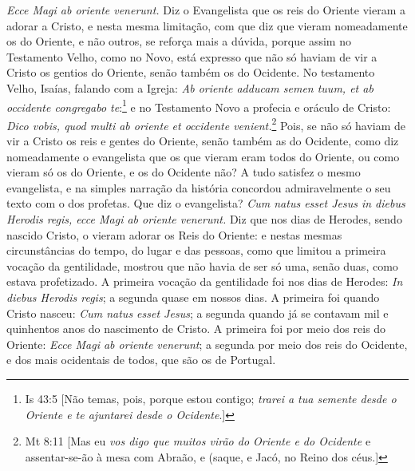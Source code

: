 \emph{Ecce Magi ab oriente venerunt.} Diz o Evangelista que os reis do
Oriente vieram a adorar a Cristo, e nesta mesma limitação, com que diz
que vieram nomeadamente os do Oriente, e não outros, se reforça mais a
dúvida, porque assim no Testamento Velho, como no Novo, está expresso
que não só haviam de vir a Cristo os gentios do Oriente, senão também os
do Ocidente. No testamento Velho, Isaías, falando com a Igreja: \emph{Ab
oriente adducam semen tuum, et ab occidente congregabo te}:\footnote{Is 43:5 [Não temas, pois, porque estou contigo; \emph{trarei a tua semente desde o Oriente e te ajuntarei
desde o Ocidente}.]}
e no Testamento Novo a profecia e oráculo de Cristo:
\emph{Dico vobis, quod multi ab oriente et occidente venient.}\footnote{Mt 8:11 [Mas eu \emph{vos digo que muitos virão do Oriente e do Ocidente} e assentar-se-ão à mesa com
Abraão, e (saque, e Jacó, no Reino dos céus.]} Pois,
se não só haviam de vir a Cristo os reis e gentes do Oriente, senão
também as do Ocidente, como diz nomeadamente o evangelista que os que
vieram eram todos do Oriente, ou como vieram só os do Oriente, e os do
Ocidente não? A tudo satisfez o mesmo evangelista, e na simples narração
da história concordou admiravelmente o seu texto com o dos profetas. Que
diz o evangelista? \emph{Cum natus esset Jesus in diebus Herodis regis,
ecce Magi ab oriente venerunt.} Diz que nos dias de Herodes, sendo
nascido Cristo, o vieram adorar os Reis do Oriente: e nestas mesmas
circunstâncias do tempo, do lugar e das pessoas, como que limitou a
primeira vocação da gentilidade, mostrou que não havia de ser só uma,
senão duas, como estava profetizado. A primeira vocação da gentilidade
foi nos dias de Herodes: \emph{In diebus Herodis regis}; a segunda
quase em nossos dias. A primeira foi quando Cristo nasceu: \emph{Cum
natus esset Jesus}; a segunda quando já se contavam mil e quinhentos
anos do nascimento de Cristo. A primeira foi por meio dos reis do
Oriente: \emph{Ecce Magi ab oriente venerunt}; a segunda por meio dos
reis do Ocidente, e dos mais ocidentais de todos, que são os de
Portugal.

